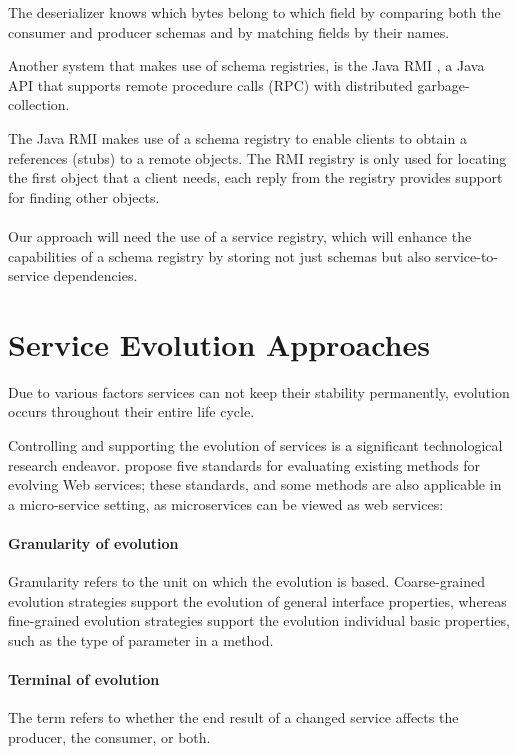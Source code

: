 The deserializer knows which bytes belong to which field by comparing both the consumer and producer schemas and by matching fields by their names.

Another system that makes use of schema registries, is the Java RMI \cite{12},
a Java API that supports remote procedure calls (RPC) with distributed garbage-collection.

The Java RMI makes use of a schema registry to enable clients to obtain a references (stubs) to a remote objects.
The RMI registry is only used for locating the first object that a client needs, each reply from the registry provides
support for finding other objects.

\paragraph{}

Our approach will need the use of a service registry, which will enhance the capabilities of a schema registry by storing not just schemas but also service-to-service dependencies.

\section{Service Evolution Approaches} %
\label{sec:service_evolution_approaches}

Due to various factors services can not keep their stability
permanently, evolution occurs throughout their entire life cycle.

Controlling and supporting the evolution of services is a significant technological research endeavor.
\citeauthor{webServiceEvolution} propose five standards for evaluating existing methods for evolving Web services;
these standards, and some methods are also applicable in a micro-service setting, as microservices can be viewed as web services:

\paragraph{Granularity of evolution}
Granularity refers to the unit on which the evolution is based.
Coarse-grained evolution strategies support the evolution of general interface properties,
whereas fine-grained evolution strategies support the evolution individual basic properties, such as the type of parameter in a method.

\paragraph{Terminal of evolution}
The term refers to whether the end result of a changed service affects the producer, the consumer, or both.

